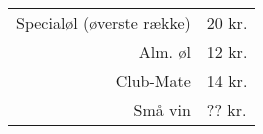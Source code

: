 \documentclass{article}
\begin{document}

\maketitle


\Huge
\begin{tabular}{r|l}
Specialøl (øverste række) & 20 kr.\\
Alm. øl & 12 kr.\\
Club-Mate & 14 kr.\\
Små vin & ?? kr.
\end{tabular}

\dansk

\underskriv
\end{document}
